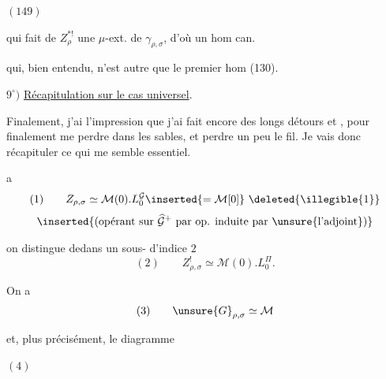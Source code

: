 \begin{samepage}
\( (149) \)\quad
{}
\end{samepage}

qui fait de $Z_\rho^{*!}$ une $\mu$-ext. de $\gamma_{\rho,\sigma}$,
d'où un hom can.


qui, bien entendu, n'est autre que le premier hom (130).

$9^\circ)$ \uline{Récapitulation sur le cas universel}.

Finalement, j'ai l'impression que j'ai fait encore des longs détours et
, pour finalement me perdre dans les sables, et perdre un
peu le fil. Je vais donc récapituler ce qui me semble essentiel.

\textcircled{a}
\[
\begin{gathered}(1)\qquad Z_{\rho,\sigma}\simeq\mathcal M(0).L_0^{\mathcal G}
\inserted{=\mathcal M[0]}\ \deleted{\illegible{1}}\\[3pt]\inserted{
\text{(opérant sur }\widehat{\mathcal G}^{+}\text{ par op. induite par }\unsure{\text{l'adjoint}}\text{)}}
\end{gathered}\]

on distingue dedans un sous- d'indice $2$
\[
(2)\qquad Z_{\rho,\sigma}^{!}\simeq\mathcal M(0).L_0^{\Pi}.
\]


On a
\[
(3)\qquad \unsure{G}_{\rho,\sigma}\simeq\mathcal M
\]

et,  plus précisément, le diagramme

\begin{samepage}
\( (4) \)\quad
{}
\end{samepage}

